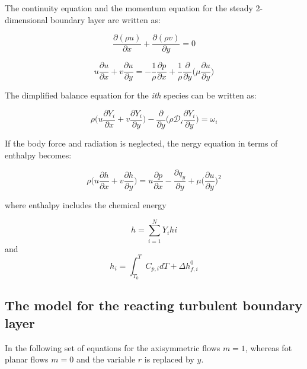\documentclass[12pt]{article}
\begin{document}
The continuity equation and the momentum equation for the steady 2-dimensional boundary layer are written as:

\begin{equation}
    \frac{\partial (\rho u)}{\partial x} + \frac{\partial (\rho v)}{\partial y} = 0
\end{equation}

\begin{equation}
    u \frac{\partial u}{\partial x} +  v \frac{\partial u}{\partial y} = - \frac{1}{\rho}\frac{\partial p}{\partial x} + \frac{1}{\rho} \frac{\partial}{\partial y}\bigg( \mu \frac{\partial u}{\partial y} \bigg)
\end{equation}

The dimplified balance equation for the \textit{ith} species can be written as:

\begin{equation}
    \rho \bigg(u \frac{\partial Y_{i}}{\partial x} +  v \frac{\partial Y_{i}}{\partial y} \bigg) - \frac{\partial}{\partial y} \bigg( \rho \mathcal{D_{i}} \frac{\partial Y_{i}}{\partial y} \bigg) = \omega_{i}
\end{equation}

If the body force and radiation is neglected, the nergy equation in terms of enthalpy becomes:

\begin{equation}
    \rho \bigg(u \frac{\partial h}{\partial x} +  v \frac{\partial h}{\partial y} \bigg) = u \frac{\partial p}{\partial x} - \frac{\partial q_{y}}{\partial y} + \mu \bigg(\frac{\partial u}{\partial y} \bigg)^{2}
\end{equation}

where enthalpy includes the chemical energy

\begin{equation}
    h = \sum_{i=1}^{N} Y_{i}h{i}
\end{equation}
and
\begin{equation}
    h_{i} = \int_{T_{0}}^{T} C_{p,i}dT + \Delta h_{f,i}^{0}
\end{equation}

\subsection{The model for the reacting turbulent boundary layer}

In the following set of equations for the axisymmetric flows $m=1$, whereas fot planar flows $m=0$ and the variable $r$ is replaced by $y$.
\end{document}
